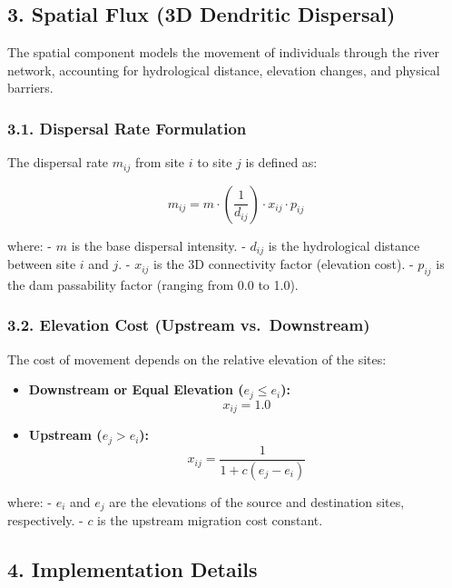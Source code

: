 \hypertarget{spatial-flux-3d-dendritic-dispersal}{%
\subsection{3. Spatial Flux (3D Dendritic
Dispersal)}\label{spatial-flux-3d-dendritic-dispersal}}

The spatial component models the movement of individuals through the
river network, accounting for hydrological distance, elevation changes,
and physical barriers.

\hypertarget{dispersal-rate-formulation}{%
\subsubsection{3.1. Dispersal Rate
Formulation}\label{dispersal-rate-formulation}}

The dispersal rate \(m_{ij}\) from site \(i\) to site \(j\) is defined
as:

\[m_{ij} = m \cdot \left( \frac{1}{d_{ij}} \right) \cdot x_{ij} \cdot p_{ij}\]

where: - \(m\) is the base dispersal intensity. - \(d_{ij}\) is the
hydrological distance between site \(i\) and \(j\). - \(x_{ij}\) is the
3D connectivity factor (elevation cost). - \(p_{ij}\) is the dam
passability factor (ranging from 0.0 to 1.0).

\hypertarget{elevation-cost-upstream-vs.-downstream}{%
\subsubsection{3.2. Elevation Cost (Upstream
vs.~Downstream)}\label{elevation-cost-upstream-vs.-downstream}}

The cost of movement depends on the relative elevation of the sites:

\begin{itemize}
\tightlist
\item
  \textbf{Downstream or Equal Elevation (\(e_j \le e_i\)):}
  \[x_{ij} = 1.0\]
\item
  \textbf{Upstream (\(e_j > e_i\)):}
  \[x_{ij} = \frac{1}{1 + c(e_j - e_i)}\]
\end{itemize}

where: - \(e_i\) and \(e_j\) are the elevations of the source and
destination sites, respectively. - \(c\) is the upstream migration cost
constant.

\hypertarget{implementation-details}{%
\subsection{4. Implementation Details}\label{implementation-details}}

